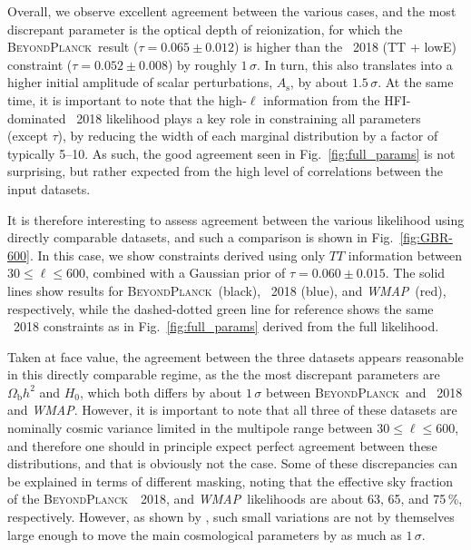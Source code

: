\documentclass[twocolumn]{aa}
\def\WMAP{\textit{WMAP}}
\newcommand{\BP}{\textsc{BeyondPlanck}}
\begin{document}
Overall, we observe excellent agreement between the various cases, and
the most discrepant parameter is the optical depth of reionization,
for which the \BP\ result ($\tau=0.065\pm0.012$) is higher than the
\Planck\ 2018 (TT + lowE) constraint ($\tau=0.052\pm0.008$) by roughly
$1\,\sigma$. In turn, this also translates into a higher initial
amplitude of scalar perturbations, $A_{\mathrm{s}}$, by about
$1.5\,\sigma$. At the same time, it is important to note that the
high-$\ell$ information from the HFI-dominated \Planck\ 2018
likelihood plays a key role in constraining all parameters (except
$\tau$), by reducing the width of each marginal distribution by a
factor of typically 5--10. As such, the good agreement seen in
Fig.~\ref{fig:full_params} is not surprising, but rather expected from
the high level of correlations between the input datasets.

It is therefore interesting to assess agreement between the various
likelihood using directly comparable datasets, and such a comparison
is shown in Fig.~\ref{fig:GBR-600}. In this case, we show constraints
derived using only $TT$ information between $30\le\ell\le600$,
combined with a Gaussian prior of $\tau=0.060\pm0.015$. The solid
lines show results for \BP\ (black), \Planck\ 2018 (blue), and
\WMAP\ (red), respectively, while the dashed-dotted green line for
reference shows the same \Planck\ 2018 constraints as in
Fig.~\ref{fig:full_params} derived from the full likelihood.

Taken at face value, the agreement between the three datasets appears
reasonable in this directly comparable regime, as the the most
discrepant parameters are $\Omega_{\mathrm{b}}h^2$ and $H_0$, which
both differs by about $1\,\sigma$ between \BP\ and \Planck\ 2018 and
\WMAP. However, it is important to note that all three of these datasets
are nominally cosmic variance limited in the multipole range between
$30\le\ell\le 600$, and therefore one should in principle expect
perfect agreement between these distributions, and that is obviously
not the case. Some of these discrepancies can be explained in terms of
different masking, noting that the effective sky fraction of the \BP\,
\Planck\ 2018, and \WMAP\ likelihoods are about 63, 65, and 75\,\%,
respectively. However, as shown by \citet{planck2016-l05}, such small
variations are not by themselves large enough to move the main
cosmological parameters by as much as $1\,\sigma$.
\end{document}
